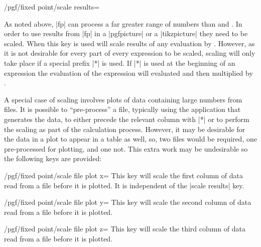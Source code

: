 \begin{key}{/pgf/fixed point/scale results=}

	As noted above, |fp| can process a far greater range of numbers
	than \pgfname{} and \tikzname{}. In order to use results from 
	|fp| in a |{pgfpicture}| or a |{tikzpicture}| they need to be
	scaled. When this key is used \pgfname{} will scale results
	of any evaluation by . However, as it is not
	desirable for every part of every expression to be scaled,
	scaling will only take place if a special prefix |*| is used.
	If |*| is used at the beginning of an expression the evaluation
	of the expression will evaluated and then multiplied by 
	.

\begin{codeexample}[]
\end{codeexample}
  
  A special case of scaling involves plots of data containing
  large numbers from files.
  It is possible to ``pre-process'' a file, typically using the 
  application that generates the data, to either precede
  the relevant column with |*| or to perform the scaling as part
  of the calculation process. However, it may be desirable for
  the data in a plot to appear in a table as well, so, two files would
  be required, one pre-processed for plotting, and one not. This
  extra work may be undesirable so the following keys are provided:
  
\begin{key}{/pgf/fixed point/scale file plot x=}
  This key will scale the first column of data read from
  a file before it is plotted. It is independent of the
  |scale results| key.
\end{key}

\begin{key}{/pgf/fixed point/scale file plot y=}
  This key will scale the second column of data read from
  a file before it is plotted. 
\end{key}

\begin{key}{/pgf/fixed point/scale file plot z=}
  This key will scale the third column of data read from
  a file before it is plotted. 
\end{key}

\end{key} 

